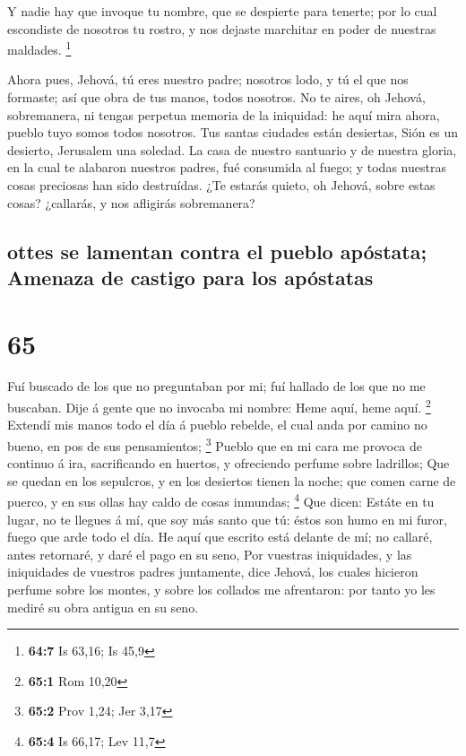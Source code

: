  Y nadie hay que invoque tu nombre, que se despierte para
tenerte; por lo cual escondiste de nosotros tu rostro, y nos dejaste
marchitar en poder de nuestras maldades. \footnote{\textbf{64:7} Is
  63,16; Is 45,9}

 Ahora pues, Jehová, tú eres nuestro padre; nosotros lodo, y
tú el que nos formaste; así que obra de tus manos, todos nosotros.
 No te aires, oh Jehová, sobremanera, ni tengas perpetua
memoria de la iniquidad: he aquí mira ahora, pueblo tuyo somos todos
nosotros.  Tus santas ciudades están desiertas, Sión es un
desierto, Jerusalem una soledad.  La casa de nuestro
santuario y de nuestra gloria, en la cual te alabaron nuestros padres,
fué consumida al fuego; y todas nuestras cosas preciosas han sido
destruídas.  ¿Te estarás quieto, oh Jehová, sobre estas
cosas? ¿callarás, y nos afligirás sobremanera?

\hypertarget{ottes-se-lamentan-contra-el-pueblo-apuxf3stata-amenaza-de-castigo-para-los-apuxf3statas}{%
\subsection{ottes se lamentan contra el pueblo apóstata; Amenaza de
castigo para los
apóstatas}\label{ottes-se-lamentan-contra-el-pueblo-apuxf3stata-amenaza-de-castigo-para-los-apuxf3statas}}

\hypertarget{section-64}{%
\section{65}\label{section-64}}

 Fuí buscado de los que no preguntaban por mi; fuí hallado
de los que no me buscaban. Dije á gente que no invocaba mi nombre: Heme
aquí, heme aquí. \footnote{\textbf{65:1} Rom 10,20}  Extendí
mis manos todo el día á pueblo rebelde, el cual anda por camino no
bueno, en pos de sus pensamientos; \footnote{\textbf{65:2} Prov 1,24;
  Jer 3,17}  Pueblo que en mi cara me provoca de continuo á
ira, sacrificando en huertos, y ofreciendo perfume sobre ladrillos;
 Que se quedan en los sepulcros, y en los desiertos tienen
la noche; que comen carne de puerco, y en sus ollas hay caldo de cosas
inmundas; \footnote{\textbf{65:4} Is 66,17; Lev 11,7}  Que
dicen: Estáte en tu lugar, no te llegues á mí, que soy más santo que tú:
éstos son humo en mi furor, fuego que arde todo el día.  He
aquí que escrito está delante de mí; no callaré, antes retornaré, y daré
el pago en su seno,  Por vuestras iniquidades, y las
iniquidades de vuestros padres juntamente, dice Jehová, los cuales
hicieron perfume sobre los montes, y sobre los collados me afrentaron:
por tanto yo les mediré su obra antigua en su seno.

